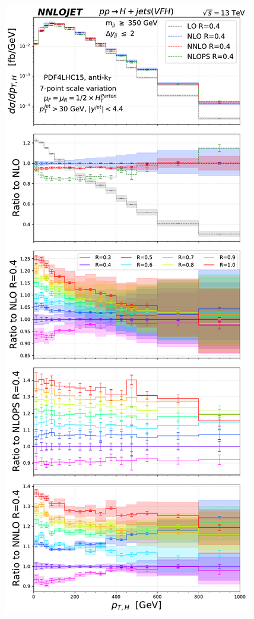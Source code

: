 \documentclass[10pt,prd,fleqn,superscriptaddress,notitlepage,nofootinbib,preprintnumbers,nobalancelastpage]{revtex4-1}
\begin{document}
\begin{figure}[t]
\centering
\includegraphics[scale=0.3]{figures/rdep/LH19VFH_pth_largebin_heavy_center.pdf}\hfill

\end{figure}
\end{document}
